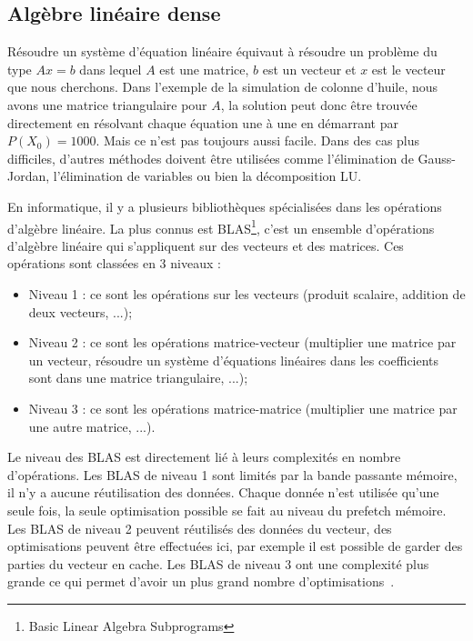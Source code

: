 \subsection{Algèbre linéaire dense}
Résoudre un système d'équation linéaire équivaut à résoudre un problème du type $Ax=b$ dans lequel $A$ est une matrice, $b$ est un vecteur et $x$ est le vecteur que nous cherchons.
%
Dans l'exemple de la simulation de colonne d'huile, nous avons une matrice triangulaire pour $A$, la solution peut donc être trouvée directement en résolvant chaque équation une à une en démarrant par $P(X_0) = 1000$.
%
Mais ce n'est pas toujours aussi facile.
%
Dans des cas plus difficiles, d'autres méthodes doivent être utilisées comme l'élimination de Gauss-Jordan, l'élimination de variables ou bien la décomposition LU.


En informatique, il y a plusieurs bibliothèques spécialisées dans les opérations d'algèbre linéaire.
%
La plus connus est BLAS\footnote{Basic Linear Algebra Subprograms}, c'est un ensemble d'opérations d'algèbre linéaire qui s'appliquent sur des vecteurs et des matrices.
%
Ces opérations sont classées en 3 niveaux :
\begin{itemize}
  \item Niveau 1 : ce sont les opérations sur les vecteurs (produit scalaire, addition de deux vecteurs, ...);
  \item Niveau 2 : ce sont les opérations matrice-vecteur (multiplier une matrice par un vecteur, résoudre un système d'équations linéaires dans les coefficients sont dans une matrice triangulaire, ...);
  \item Niveau 3 : ce sont les opérations matrice-matrice (multiplier une matrice par une autre matrice, ...).
\end{itemize}
%
Le niveau des BLAS est directement lié à leurs complexités en nombre d'opérations.
%
Les BLAS de niveau 1 sont limités par la bande passante mémoire, il n'y a aucune réutilisation des données.
%
Chaque donnée n'est utilisée qu'une seule fois, la seule optimisation possible se fait au niveau du prefetch mémoire.
%
Les BLAS de niveau 2 peuvent réutilisés des données du vecteur, des optimisations peuvent être effectuées ici, par exemple il est possible de garder des parties du vecteur en cache.
%
Les BLAS de niveau 3 ont une complexité plus grande ce qui permet d'avoir un plus grand nombre d'optimisations~\cite{blas3_opt}.

